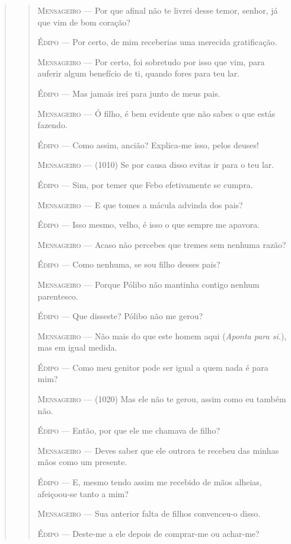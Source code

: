 \begin{verse}
\begin{verse}
\textsc{Mensageiro} --- Por que afinal não te livrei desse temor, senhor, já que vim de bom
coração?

\textsc{Édipo} --- Por certo, de mim receberias uma merecida gratificação.

\textsc{Mensageiro} --- Por certo, foi sobretudo por isso que vim, para auferir algum benefício
de ti, quando fores para teu lar.

\textsc{Édipo} --- Mas jamais irei para junto de meus pais.

\textsc{Mensageiro} --- Ó filho, é bem evidente que não sabes o que estás fazendo.

\textsc{Édipo} --- Como assim, ancião? Explica-me isso, pelos deuses!

\textsc{Mensageiro} --- (1010) Se por causa disso evitas ir para o teu lar.

\textsc{Édipo} --- Sim, por temer que Febo efetivamente se cumpra.

\textsc{Mensageiro} --- E que tomes a mácula advinda dos pais?

\textsc{Édipo} --- Isso mesmo, velho, é isso o que sempre me apavora.

\textsc{Mensageiro} --- Acaso não percebes que tremes sem nenhuma razão?

\textsc{Édipo} --- Como nenhuma, se sou filho desses pais?

\textsc{Mensageiro} --- Porque Pólibo não mantinha contigo nenhum parentesco.

\textsc{Édipo} --- Que disseste? Pólibo não me gerou?

\textsc{Mensageiro} --- Não mais do que este homem aqui (\emph{Aponta para si.}), mas em igual
medida.

\textsc{Édipo} --- Como meu genitor pode ser igual a quem nada é para mim?

\textsc{Mensageiro} --- (1020) Mas ele não te gerou, assim como eu também não.

\textsc{Édipo} --- Então, por que ele me chamava de filho?

\textsc{Mensageiro} --- Deves saber que ele outrora te recebeu das minhas mãos como um presente.

\textsc{Édipo} --- E, mesmo tendo assim me recebido de mãos alheias, afeiçoou-se tanto a
mim?

\textsc{Mensageiro} --- Sua anterior falta de filhos convenceu-o disso.

\textsc{Édipo} --- Deste-me a ele depois de comprar-me ou achar-me?


\end{verse}
\end{verse}
